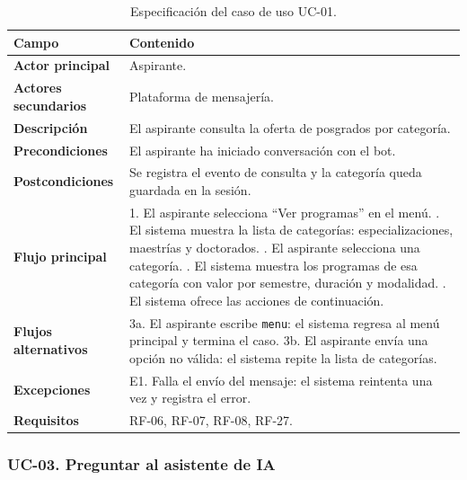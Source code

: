 \documentclass[12pt,a4paper]{report}
\newcommand{\tablacompacta}{\setstretch{1.1}\small}
\newcommand{\cabecera}[1]{\rowcolor{filacabecera}#1}
\begin{document}
\begin{table}[H]
    \centering
    \tablacompacta
    \begin{tabularx}{\textwidth}{p{3.2cm}X}
        \toprule
        \cabecera{\textbf{Campo}} & \textbf{Contenido} \\
        \midrule
        \textbf{Actor principal} & Aspirante. \\
        \textbf{Actores secundarios} & Plataforma de mensajería. \\
        \textbf{Descripción} & El aspirante consulta la oferta de posgrados por categoría. \\
        \textbf{Precondiciones} & El aspirante ha iniciado conversación con el bot. \\
        \textbf{Postcondiciones} & Se registra el evento de consulta y la categoría queda guardada en la sesión. \\
        \textbf{Flujo principal} &
        1. El aspirante selecciona ``Ver programas'' en el menú. \newline
        2. El sistema muestra la lista de categorías: especializaciones, maestrías y doctorados. \newline
        3. El aspirante selecciona una categoría. \newline
        4. El sistema muestra los programas de esa categoría con valor por semestre, duración y modalidad. \newline
        5. El sistema ofrece las acciones de continuación. \\
        \textbf{Flujos alternativos} &
        3a. El aspirante escribe \texttt{menu}: el sistema regresa al menú principal y termina el caso. \newline
        3b. El aspirante envía una opción no válida: el sistema repite la lista de categorías. \\
        \textbf{Excepciones} & E1. Falla el envío del mensaje: el sistema reintenta una vez y registra el error. \\
        \textbf{Requisitos} & RF-06, RF-07, RF-08, RF-27. \\
        \bottomrule
    \end{tabularx}
    \caption{Especificación del caso de uso UC-01.}
\end{table}

\subsubsection{UC-03. Preguntar al asistente de IA}
\end{document}
